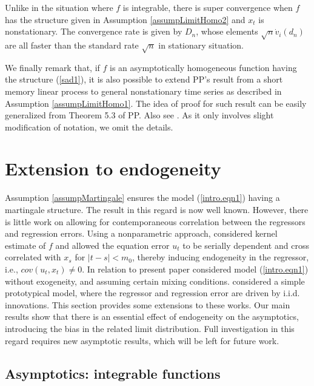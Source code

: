 \begin{rem}
Unlike in the situation where $f$ is integrable, there is super convergence when $f$ has the structure given in Assumption \ref{assumpLimitHomo2} and  $x_t$ is nonstationary. The convergence rate is given by $D_n$, whose elements $\sqrt{n} \dot{v}_i(d_n)$ are all faster than the standard rate $\sqrt{n}$ in stationary situation.
\end{rem}

We finally remark that, if  $f$ is an asymptotically homogeneous function
having the structure (\ref {sad1}), it is also possible to extend PP's result from a short memory  linear process to  general nonstationary time series as described  in Assumption \ref{assumpLimitHomo1}. The idea of proof for such result can be easily generalized from Theorem 5.3 of PP. Also see \cite{changparkphillips2001}.  As it only involves slight modification of notation, we omit the details.


\section{Extension to endogeneity } 

Assumption \ref{assumpMartingale} ensures the model (\ref {intro.eqn1}) having a martingale structure.
The result in this regard is now well known. However, there is little work
on allowing for contemporaneous correlation between the regressors and regression errors.
Using a nonparametric approach, \cite{wangphillips2009} considered kernel estimate of $f$ and allowed the equation error $u_t$ to be serially dependent and cross correlated with $x_s$ for $|t-s|<m_0$, thereby inducing endogeneity in the regressor, i.e., $cov (u_t, x_t)\not=0$. In relation to present paper \cite{dejong2002} considered model (\ref{intro.eqn1}) without exogeneity, and assuming certain mixing conditions. \cite{changpark2010} considered a simple prototypical model, where the regressor and regression error are driven by i.i.d. innovations. This section  provides some  extensions to these works. Our main results  show that there is an essential effect of endogeneity on the asymptotics,  introducing the bias in the related limit distribution. Full investigation in this regard requires new asymptotic results, which will be left for future work.


\subsection{Asymptotics: integrable functions} 

